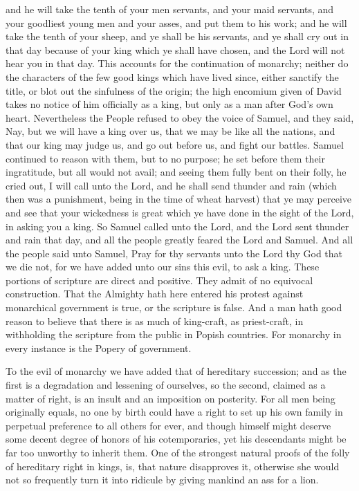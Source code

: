 \documentclass[12pt,oneside]{memoir}
\begin{document}
and he will take the tenth of your men servants, and your maid
servants, and your goodliest young men and your asses, and put them
to his work; and he will take the tenth of your sheep, and ye shall
be his servants, and ye shall cry out in that day because of your
king which ye shall have chosen, and the Lord will not hear you in
that day. This accounts for the continuation of monarchy; neither do
the characters of the few good kings which have lived since, either
sanctify the title, or blot out the sinfulness of the origin; the
high encomium given of David takes no notice of him officially as a
king, but only as a man after God's own heart. Nevertheless the
People refused to obey the voice of Samuel, and they said, Nay, but
we will have a king over us, that we may be like all the nations,
and that our king may judge us, and go out before us, and fight our
battles. Samuel continued to reason with them, but to no purpose; he
set before them their ingratitude, but all would not avail; and
seeing them fully bent on their folly, he cried out, I will call
unto the Lord, and he shall send thunder and rain (which then was a
punishment, being in the time of wheat harvest) that ye may perceive
and see that your wickedness is great which ye have done in the
sight of the Lord, in asking you a king. So Samuel called unto the
Lord, and the Lord sent thunder and rain that day, and all the
people greatly feared the Lord and Samuel. And all the people said
unto Samuel, Pray for thy servants unto the Lord thy God that we die
not, for we have added unto our sins this evil, to ask a king. These
portions of scripture are direct and positive. They admit of no
equivocal construction. That the Almighty hath here entered his
protest against monarchical government is true, or the scripture is
false. And a man hath good reason to believe that there is as much
of king-craft, as priest-craft, in withholding the scripture from
the public in Popish countries. For monarchy in every instance is
the Popery of government.

To the evil of monarchy we have added that of hereditary succession;
and as the first is a degradation and lessening of ourselves, so the
second, claimed as a matter of right, is an insult and an imposition
on posterity. For all men being originally equals, no one by birth
could have a right to set up his own family in perpetual preference
to all others for ever, and though himself might deserve some decent
degree of honors of his cotemporaries, yet his descendants might be
far too unworthy to inherit them. One of the strongest natural
proofs of the folly of hereditary right in kings, is, that nature
disapproves it, otherwise she would not so frequently turn it into
ridicule by giving mankind an ass for a lion.
\end{document}
